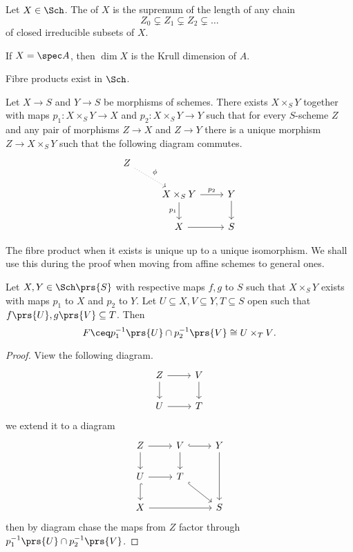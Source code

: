\documentclass[10pt,a4paper,twoside,openany,hidelinks]{book}
\begin{document}
\begin{definition}[Dimension]
Let $X \in \Sch$. The  of $X$ is the supremum of the length of any chain $$Z_0 \subsetneq Z_1 \subsetneq Z_2 \subsetneq \ldots$$ of closed irreducible subsets of $X$.
\end{definition}

\begin{remark}
If $X = \spec A$, then $\dim X$ is the Krull dimension of $A$.
\end{remark}

\begin{proposition}\label{proposition:fibre_products}
Fibre products exist in $\Sch$.

Let $X \to S$ and $Y \to S$ be morphisms of schemes. There exists  $X \times_S Y$ together with maps $p_1 \colon X \times_S Y \to X$ and $p_2 \colon X \times_S Y \to Y$ such that for every $S$-scheme $Z$ and any pair of morphisms $Z \to X$ and $Z \to Y$ there is a unique morphism $Z \to X \times_S Y$ such that the following diagram commutes.
$$
\begin{tikzcd}
Z \arrow[dr, dotted, "\phi"] & & \\ & X \times_S Y \arrow[r, "p_2"] \arrow[d, "p_1", swap] & Y \arrow[d] \\ & X \arrow[r] & S
\end{tikzcd}
$$
\end{proposition}

\begin{remark}
The fibre product when it exists is unique up to a unique isomorphism. We shall use this during the proof when moving from affine schemes to general ones.
\end{remark}

\begin{lemma}\label{lemma:fibre_products}
Let $X,Y \in \Sch\prs{S}$ with respective maps $f,g$ to $S$ such that $X \times_S Y$ exists with maps $p_1$ to $X$ and $p_2$ to $Y$. Let $U \subseteq X, V \subseteq Y, T \subseteq S$ open such that $f\prs{U}, g\prs{V} \subseteq T$. Then
$$F \ceq p_1^{-1}\prs{U} \cap p_2^{-1}\prs{V} \cong U \times_T V \text{.}$$
\end{lemma}

\begin{proof}
View the following diagram.
$$
\begin{tikzcd}
Z \arrow[r] \arrow[d] & V \arrow[d] \\ U \arrow[r] & T
\end{tikzcd}
$$
we extend it to a diagram
$$
\begin{tikzcd}
Z \arrow[r] \arrow[d] & V \arrow[d] \arrow[r, hookrightarrow] & Y \arrow[dd] \\ U \arrow[d,hookrightarrow] \arrow[r] & T \arrow[dr, hookrightarrow] & \\
X \arrow[rr] & & S
\end{tikzcd}
$$
then by diagram chase the maps from $Z$ factor through $p_1^{-1}\prs{U} \cap p_2^{-1}\prs{V}$.
\end{proof}
\end{document}
